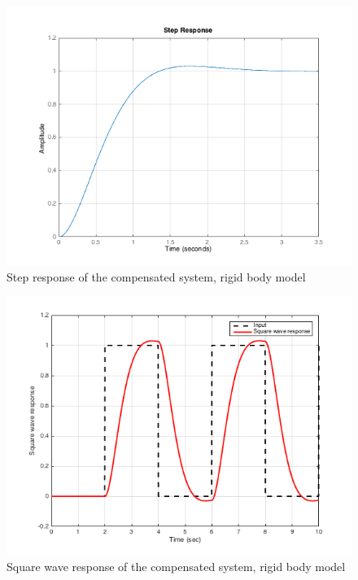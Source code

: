 \documentclass[a4paper, 12pt]{article}
\begin{document}
\begin{figure}[!htbp]
\centering
\includegraphics[scale = 0.6]{StepResponseLeadLag}
\caption{Step response of the compensated system, rigid body model}
\label{StepResponseLeadLag}
\end{figure}

\begin{figure}[!htbp]
\centering
\includegraphics[scale = 0.6]{CubicResponseLeadLag}
\caption{Square wave response of the compensated system, rigid body model}
\label{CubicResponseLeadLag}
\end{figure}
\end{document}
